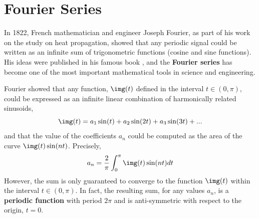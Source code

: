 \section{Fourier Series}




In 1822, French mathematician and engineer Joseph Fourier, as part of his work on the study on heat propagation, showed that 
any periodic signal could be written as an infinite sum of trigonometric functions (cosine and sine functions).  His ideas were published in his famous book  \cite{Fourier09}, and the {\bf Fourier series} has become one of the most important mathematical tools in science and engineering. 





Fourier showed that any function, $\img (t)$ defined in the interval $t \in (0,\pi)$, could be expressed as an infinite linear combination of harmonically related sinusoids,
\begin{equation}
\img (t) = a_1 \sin (t) + a_2 \sin (2t) + a_3 \sin (3t) + ...
\end{equation}
and that the value of the coefficients $a_n$ could be computed as the area of the curve $\img(t) \sin (nt)$. Precisely,
\begin{equation} 
a_n = \frac{2}{\pi} \int_0^\pi  \img (t) \sin (nt) dt
\end{equation}
 However, the sum is only guaranteed to converge to the function $\img (t)$ within the interval $t \in (0,\pi)$. In fact, the resulting sum, for any values $a_n$, is a {\bf periodic function} with period $2\pi$ and is anti-symmetric with respect to the origin, $t=0$. %

